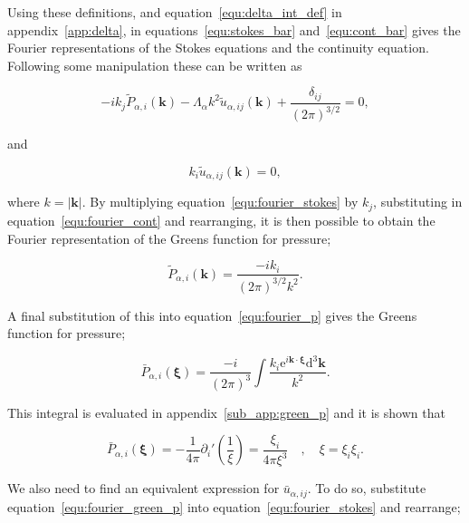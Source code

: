 \documentclass[12pt]{article}
\begin{document}
Using these definitions, and equation~\ref{equ:delta_int_def} in appendix~\ref{app:delta}, in equations~\ref{equ:stokes_bar} and~\ref{equ:cont_bar} gives the Fourier representations of the Stokes equations and the continuity equation. Following some manipulation these can be written as

\begin{equation}
\label{equ:fourier_stokes}
-i k_{j} \tilde{P}_{\alpha, i} (\boldsymbol{k}) - \Lambda_{\alpha} k^{2} \tilde{u}_{\alpha,ij} (\boldsymbol{k}) + \frac{\delta_{ij}}{(2 \pi)^{3/2}} = 0 ,
\end{equation}

and 

\begin{equation}
\label{equ:fourier_cont}
k_{i} \tilde{u}_{\alpha,ij} (\boldsymbol{k}) = 0 ,
\end{equation}

where $k = |\boldsymbol{k}|$. By multiplying equation~\ref{equ:fourier_stokes} by $k_{j}$, substituting in equation~\ref{equ:fourier_cont} and rearranging, it is then possible to obtain the Fourier representation of the Greens function for pressure;

\begin{equation}
\label{equ:fourier_green_p}
\tilde{P}_{\alpha, i} (\boldsymbol{k}) = \frac{-i k_{i}}{(2 \pi)^{3/2} k^{2}}.
\end{equation}

A final substitution of this into equation~\ref{equ:fourier_p} gives the Greens function for pressure;

\begin{equation}
\label{equ:green_p_int}
\bar{P}_{\alpha, i} (\boldsymbol\xi) = \frac{-i}{(2 \pi)^{3}} \int \frac{k_{i} \mathrm{e}^{i \boldsymbol{k} \cdot \boldsymbol{\xi}} \mathrm{d}^{3} \boldsymbol{k}}{k^{2}} .
\end{equation}

This integral is evaluated in appendix~\ref{sub_app:green_p} and it is shown that

\begin{equation}
\label{equ:green_p}
\bar{P}_{\alpha, i} (\boldsymbol\xi) = -\frac{1}{4 \pi} \partial_{i}' \left(\frac{1}{\xi}\right) = \frac{\xi_{i}}{4 \pi \xi^{3}} \quad , \quad \xi = \xi_{i} \xi_{i} .
\end{equation}

We also need to find an equivalent expression for $\bar{u}_{\alpha,ij}$. To do so, substitute equation~\ref{equ:fourier_green_p} into equation~\ref{equ:fourier_stokes} and rearrange;
\end{document}
